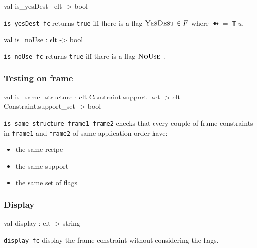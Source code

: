 \begin{ocamldocsigend}
\label{val:Constraint.Frame.is-underscoreyesDest}\begin{ocamldoccode}
val is_yesDest : elt -> bool
\end{ocamldoccode}
\begin{ocamldocdescription}
{\tt{is\_yesDest fc}} returns {\tt{true}} iff there is a flag $\textsc{YesDest} \in F$
      where $\ffun = \Top{u}$. 


\end{ocamldocdescription}


\label{val:Constraint.Frame.is-underscorenoUse}\begin{ocamldoccode}
val is_noUse : elt -> bool
\end{ocamldoccode}
\begin{ocamldocdescription}
{\tt{is\_noUse fc}} returns {\tt{true}} iff there is a flag $\textsc{NoUse}$ .


\end{ocamldocdescription}


\subsubsection{Testing on frame}


\label{val:Constraint.Frame.is-underscoresame-underscorestructure}\begin{ocamldoccode}
val is_same_structure :
  elt Constraint.support_set ->
  elt Constraint.support_set -> bool
\end{ocamldoccode}
\begin{ocamldocdescription}
{\tt{is\_same\_structure frame1 frame2}} checks that every couple of frame constraints in {\tt{frame1}} and {\tt{frame2}}
      of same application order have:
      \begin{itemize}
\item the same recipe 
\item the same support 
\item the same set of flags
\end{itemize}



\end{ocamldocdescription}


\subsubsection{Display}


\label{val:Constraint.Frame.display}\begin{ocamldoccode}
val display : elt -> string
\end{ocamldoccode}
\begin{ocamldocdescription}
{\tt{display fc}} display the frame constraint without considering the flags.


\end{ocamldocdescription}
\end{ocamldocsigend}






